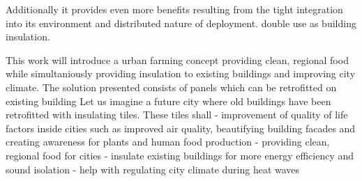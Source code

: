 Additionally it provides even more benefits resulting from the tight integration into its environment and distributed nature of deployment.
double use as building insulation.

This work will introduce a urban farming concept providing clean, regional food while simultaniously providing insulation to existing buildings and improving city climate.
The solution presented consists of panels which can be retrofitted on existing building
Let us imagine a future city where old buildings have been retrofitted with insulating tiles. These tiles shall 
- improvement of quality of life factors inside cities such as improved air quality, beautifying building facades and creating awareness for plants and human food production
- providing clean, regional food for cities
- insulate existing buildings for more energy efficiency and sound isolation
- help with regulating city climate during heat waves
